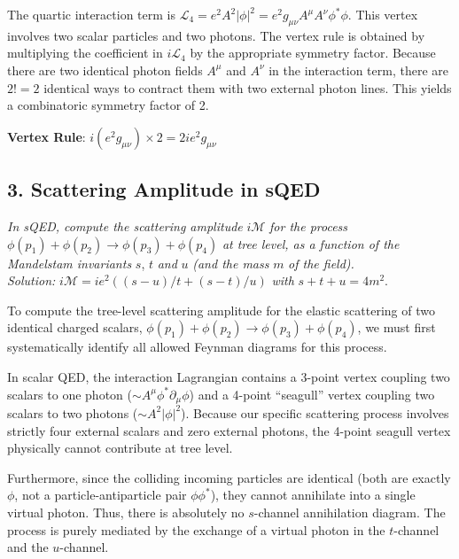 \begin{itemize}
          The quartic interaction term is $\mathcal{L}_4 = e^2 A^2 |\phi|^2 = e^2 g_{\mu\nu} A^\mu A^\nu \phi^* \phi$.
          This vertex involves two scalar particles and two photons. The vertex rule is obtained by multiplying the coefficient in $i\mathcal{L}_4$ by the appropriate symmetry factor.
          Because there are two identical photon fields $A^\mu$ and $A^\nu$ in the interaction term, there are $2! = 2$ identical ways to contract them with two external photon lines. This yields a combinatoric symmetry factor of 2.

          \begin{center}
              \textbf{Vertex Rule}: $i (e^2 g_{\mu\nu}) \times 2 = 2ie^2 g_{\mu\nu}$
          \end{center}
\end{itemize}


\subsection*{3. Scattering Amplitude in sQED}

\begin{center}
    \textit{In sQED, compute the scattering amplitude } $i\mathcal{M}$ \textit{ for the process } $\phi(p_1)+\phi(p_2) \to \phi(p_3)+\phi(p_4)$ \textit{ at tree level, as a function of the Mandelstam invariants } $s$, $t$ \textit{ and } $u$ \textit{ (and the mass } $m$ \textit{ of the field).} \\
    \textit{Solution: } $i\mathcal{M} = ie^2((s-u)/t + (s-t)/u)$ \textit{ with } $s+t+u = 4m^2$.
\end{center}

To compute the tree-level scattering amplitude for the elastic scattering of two identical charged scalars, $\phi(p_1)+\phi(p_2) \to \phi(p_3)+\phi(p_4)$, we must first systematically identify all allowed Feynman diagrams for this process.

In scalar QED, the interaction Lagrangian contains a 3-point vertex coupling two scalars to one photon ($\sim A^\mu \phi^* \partial_\mu \phi$) and a 4-point ``seagull'' vertex coupling two scalars to two photons ($\sim A^2 |\phi|^2$). Because our specific scattering process involves strictly four external scalars and zero external photons, the 4-point seagull vertex physically cannot contribute at tree level.

Furthermore, since the colliding incoming particles are identical (both are exactly $\phi$, not a particle-antiparticle pair $\phi \phi^*$), they cannot annihilate into a single virtual photon. Thus, there is absolutely no $s$-channel annihilation diagram. The process is purely mediated by the exchange of a virtual photon in the $t$-channel and the $u$-channel.

